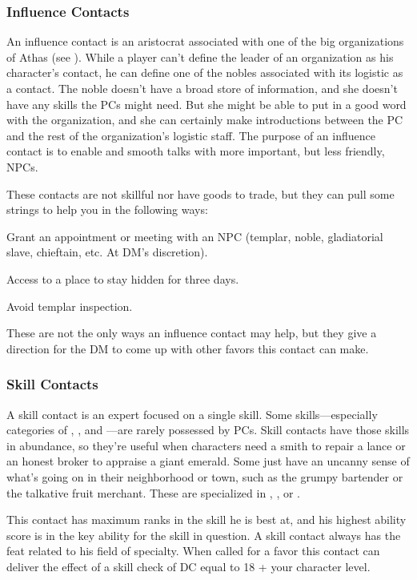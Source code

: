 \subsubsection{Influence Contacts}
An influence contact is an aristocrat associated with one of the big organizations of Athas (see ). While a player can't define the leader of an organization as his character's contact, he can define one of the nobles associated with its logistic as a contact. The noble doesn't have a broad store of information, and she doesn't have any skills the PCs might need. But she might be able to put in a good word with the organization, and she can certainly make introductions between the PC and the rest of the organization's logistic staff. The purpose of an influence contact is to enable and smooth talks with more important, but less friendly, NPCs.

These contacts are not skillful nor have goods to trade, but they can pull some strings to help you in the following ways: 

\begin{itemize*}
\item Grant an appointment or meeting with an NPC (templar, noble, gladiatorial slave, chieftain, etc. At DM's discretion).
\item Access to a place to stay hidden for three days.
\item Avoid templar inspection.
\end{itemize*}

These are not the only ways an influence contact may help, but they give a direction for the DM to come up with other favors this contact can make.

\subsubsection{Skill Contacts}
A skill contact is an expert focused on a single skill. Some skills---especially categories of , , and ---are rarely possessed by PCs. Skill contacts have those skills in abundance, so they're useful when characters need a smith to repair a lance or an honest broker to appraise a giant emerald. Some just have an uncanny sense of what's going on in their neighborhood or town, such as the grumpy bartender or the talkative fruit merchant. These are specialized in , , or .

This contact has maximum ranks in the skill he is best at, and his highest ability score is in the key ability for the skill in question. A skill contact always has the  feat related to his field of specialty. When called for a favor this contact can deliver the effect of a skill check of DC equal to 18 + \onehalf your character level.

